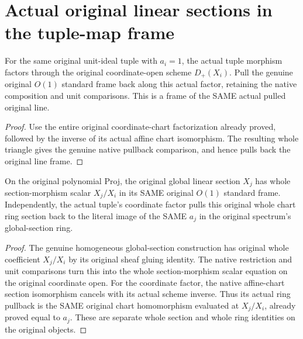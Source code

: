 \section{Actual original linear sections in the tuple-map frame}

\begin{definition}
\label{def:fc-generated-tuple-twist-frame}
\leanok
{}
For the same original unit-ideal tuple with $a_i=1$, the actual
tuple morphism factors through the original coordinate-open scheme
$D_+(X_i)$. Pull the genuine original $O(1)$ standard frame back
along this actual factor, retaining the native composition and unit
comparisons. This is a frame of the SAME actual pulled original line.
\end{definition}
\begin{proof}
Use the entire original coordinate-chart factorization already
proved, followed by the inverse of its actual affine chart
isomorphism. The resulting whole triangle gives the genuine native
pullback comparison, and hence pulls back the original line frame.
\end{proof}

\begin{theorem}
\label{thm:fc-generated-tuple-twist-section-scalars}
\leanok
{}
On the original polynomial Proj, the original global linear section
$X_j$ has whole section-morphism scalar $X_j/X_i$ in its SAME
original $O(1)$ standard frame. Independently, the actual tuple's
coordinate factor pulls this original whole chart ring section
back to the literal image of the SAME $a_j$ in the original
spectrum's global-section ring.
\end{theorem}
\begin{proof}
The genuine homogeneous global-section construction has original
whole coefficient $X_j/X_i$ by its original sheaf gluing identity.
The native restriction and unit comparisons turn this into the
whole section-morphism scalar equation on the original coordinate
open. For the coordinate factor, the native affine-chart section
isomorphism cancels with its actual scheme inverse. Thus its actual
ring pullback is the SAME original chart homomorphism evaluated
at $X_j/X_i$, already proved equal to $a_j$. These are separate
whole section and whole ring identities on the original objects.
\end{proof}
